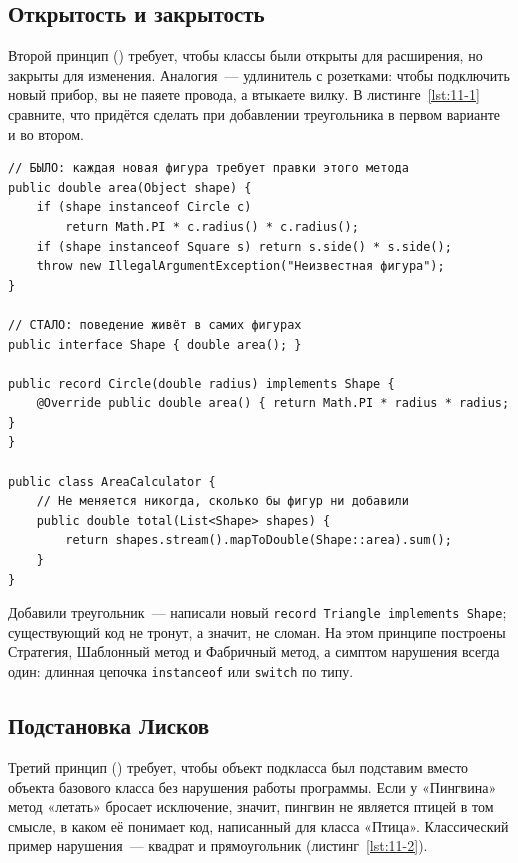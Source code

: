 \subsection{Открытость и закрытость}

Второй принцип () требует, чтобы классы были
открыты для расширения, но закрыты для изменения. Аналогия~--- удлинитель с
розетками: чтобы подключить новый прибор, вы не паяете провода, а втыкаете
вилку. В листинге~\ref{lst:11-1} сравните, что придётся сделать при добавлении
треугольника в первом варианте и во втором.

\begin{listing}[H]
\begin{verbatim}
// БЫЛО: каждая новая фигура требует правки этого метода
public double area(Object shape) {
    if (shape instanceof Circle c)
        return Math.PI * c.radius() * c.radius();
    if (shape instanceof Square s) return s.side() * s.side();
    throw new IllegalArgumentException("Неизвестная фигура");
}

// СТАЛО: поведение живёт в самих фигурах
public interface Shape { double area(); }

public record Circle(double radius) implements Shape {
    @Override public double area() { return Math.PI * radius * radius; }
}

public class AreaCalculator {
    // Не меняется никогда, сколько бы фигур ни добавили
    public double total(List<Shape> shapes) {
        return shapes.stream().mapToDouble(Shape::area).sum();
    }
}
\end{verbatim}
\caption{Нарушение и соблюдение принципа открытости/закрытости}
\label{lst:11-1}
\end{listing}

Добавили треугольник~--- написали новый \texttt{record Triangle implements
Shape}; существующий код не тронут, а значит, не сломан. На этом принципе
построены Стратегия, Шаблонный метод и Фабричный метод, а симптом нарушения
всегда один: длинная цепочка \texttt{instanceof} или \texttt{switch} по типу.

\subsection{Подстановка Лисков}

Третий принцип () требует, чтобы объект
подкласса был подставим вместо объекта базового класса без нарушения работы
программы. Если у «Пингвина» метод «летать» бросает исключение, значит, пингвин
не является птицей в том смысле, в каком её понимает код, написанный для класса
«Птица». Классический пример нарушения~--- квадрат и прямоугольник
(листинг~\ref{lst:11-2}).

